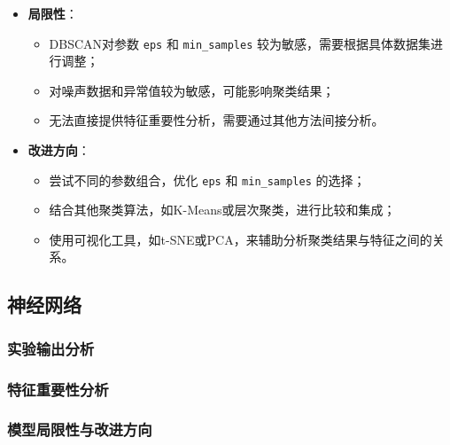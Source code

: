 \documentclass{SYSUReport}
\begin{document}
\begin{itemize}
\item \textbf{局限性}：
\begin{itemize}
\item DBSCAN对参数 \texttt{eps} 和 \texttt{min_samples} 较为敏感，需要根据具体数据集进行调整；
\item 对噪声数据和异常值较为敏感，可能影响聚类结果；
\item 无法直接提供特征重要性分析，需要通过其他方法间接分析。
\end{itemize}

\item \textbf{改进方向}：
\begin{itemize}
\item 尝试不同的参数组合，优化 \texttt{eps} 和 \texttt{min_samples} 的选择；
\item 结合其他聚类算法，如K-Means或层次聚类，进行比较和集成；
\item 使用可视化工具，如t-SNE或PCA，来辅助分析聚类结果与特征之间的关系。
\end{itemize}
\end{itemize}

\subsection{神经网络}
\subsubsection{实验输出分析}
\subsubsection{特征重要性分析}
\subsubsection{模型局限性与改进方向}
\end{document}
